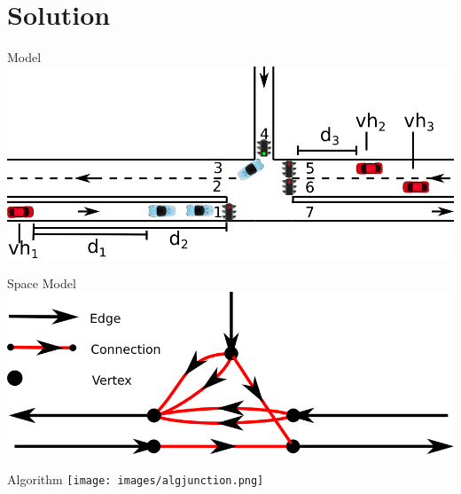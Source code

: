 
\section{Solution}
\begin{frame}{Model}
\includegraphics[width=1\textwidth]{images/introNetwork.png}
\end{frame}

\begin{frame}{Space Model}
\includegraphics[width=1\textwidth]{images/ConnectionNetwork.png}
\end{frame}

\begin{frame}{Algorithm}
\texttt{[image: images/algjunction.png]}
\end{frame}